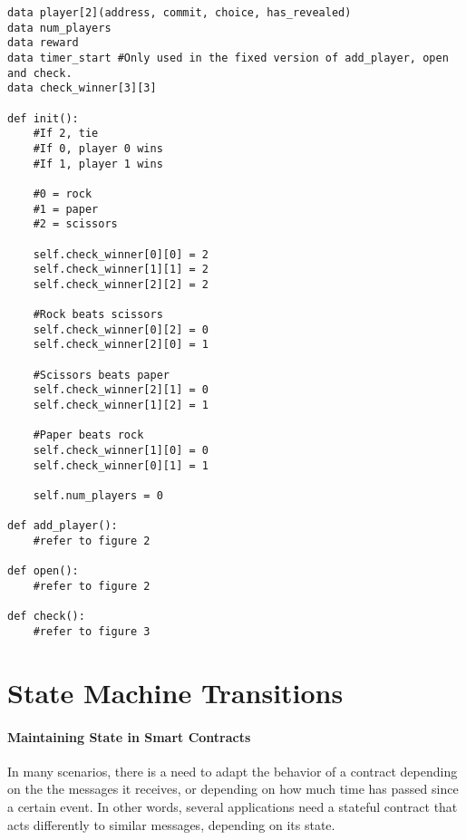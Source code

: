 \documentclass[10pt,twocolumn,letterpaper]{article}
\begin{document}
\begin{mdframed}
\begin{verbatim}
data player[2](address, commit, choice, has_revealed)
data num_players
data reward
data timer_start #Only used in the fixed version of add_player, open and check.
data check_winner[3][3]

def init():
	#If 2, tie
	#If 0, player 0 wins
	#If 1, player 1 wins

	#0 = rock
	#1 = paper
	#2 = scissors

	self.check_winner[0][0] = 2
	self.check_winner[1][1] = 2
	self.check_winner[2][2] = 2

	#Rock beats scissors
	self.check_winner[0][2] = 0
	self.check_winner[2][0] = 1

	#Scissors beats paper
	self.check_winner[2][1] = 0
	self.check_winner[1][2] = 1

	#Paper beats rock
	self.check_winner[1][0] = 0
	self.check_winner[0][1] = 1

	self.num_players = 0
	
def add_player():
	#refer to figure 2
	
def open():
	#refer to figure 2
	
def check():
	#refer to figure 3
\end{verbatim}
\end{mdframed}

\section{State Machine Transitions}

\paragraph{Maintaining State in Smart Contracts}

In many scenarios, there is a need to adapt the behavior of a contract depending on the the messages it receives, or depending on how much time has passed since a certain event. In other words, several applications need a stateful contract that acts differently to similar messages, depending on its state.
\end{document}
